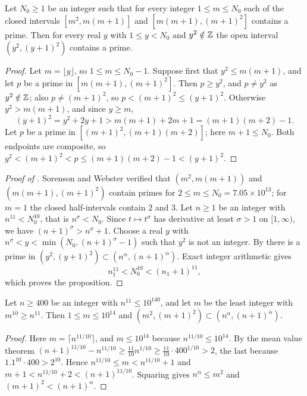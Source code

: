 \documentclass[11pt,colorlinks]{charlie}
\begin{document}
\begin{lemma}\label{lem:halfsquares}
Let $N_0\ge1$ be an integer such that for every integer $1\le m\le N_0$ each of the closed intervals $[m^2,m(m+1)]$ and $[m(m+1),(m+1)^2]$ contains a prime. Then for every real $y$ with $1\le y<N_0$ and $y^2\notin\mathbb{Z}$ the open interval $(y^2,(y+1)^2)$ contains a prime.
\end{lemma}
\begin{proof}
Let $m=\lfloor y\rfloor$, so $1\le m\le N_0-1$. Suppose first that $y^2\le m(m+1)$, and let $p$ be a prime in $[m(m+1),(m+1)^2]$. Then $p\ge y^2$, and $p\ne y^2$ as $y^2\notin\mathbb{Z}$; also $p\ne(m+1)^2$, so $p<(m+1)^2\le(y+1)^2$. Otherwise $y^2>m(m+1)$, and since $y\ge m$,
\[
 (y+1)^2=y^2+2y+1>m(m+1)+2m+1=(m+1)(m+2)-1 .
\]
Let $p$ be a prime in $[(m+1)^2,(m+1)(m+2)]$; here $m+1\le N_0$. Both endpoints are composite, so $y^2<(m+1)^2<p\le(m+1)(m+2)-1<(y+1)^2$.
\end{proof}

\begin{proof}[Proof of ]
Sorenson and Webster \cite{SW} verified that $(m^2,m(m+1))$ and $(m(m+1),(m+1)^2)$ contain primes for $2\le m\le N_0=7.05\times10^{13}$; for $m=1$ the closed half-intervals contain $2$ and $3$. Let $n\ge1$ be an integer with $n^{11}<N_0^{10}$, that is $n^\sigma<N_0$. Since $t\mapsto t^\sigma$ has derivative at least $\sigma>1$ on $[1,\infty)$, we have $(n+1)^\sigma>n^\sigma+1$. Choose a real $y$ with $n^\sigma<y<\min(N_0,(n+1)^\sigma-1)$ such that $y^2$ is not an integer. By  there is a prime in $(y^2,(y+1)^2)\subset(n^{\alpha},(n+1)^{\alpha})$. Exact integer arithmetic gives
\[
 n_1^{11}<N_0^{10}<(n_1+1)^{11},
\]
which proves the proposition.
\end{proof}

\begin{lemma}\label{lem:squarepower}
Let $n\ge400$ be an integer with $n^{11}\le10^{140}$, and let $m$ be the least integer with $m^{10}\ge n^{11}$. Then $1\le m\le10^{14}$ and $(m^2,(m+1)^2)\subset(n^\alpha,(n+1)^\alpha)$.
\end{lemma}
\begin{proof}
Here $m=\lceil n^{11/10}\rceil$, and $m\le10^{14}$ because $n^{11/10}\le10^{14}$. By the mean value theorem $(n+1)^{11/10}-n^{11/10}\ge\frac{11}{10}n^{1/10}\ge\frac{11}{10}\cdot400^{1/10}>2$, the last because $1.1^{10}\cdot400>2^{10}$. Hence $n^{11/10}\le m<n^{11/10}+1$ and $m+1<n^{11/10}+2<(n+1)^{11/10}$. Squaring gives $n^\alpha\le m^2$ and $(m+1)^2<(n+1)^\alpha$.
\end{proof}
\end{document}
